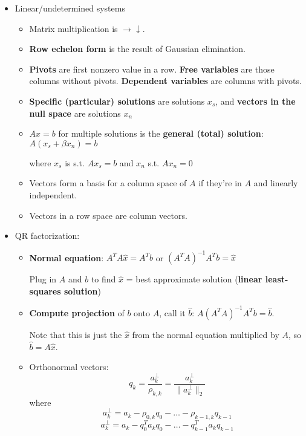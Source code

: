\documentclass[a4paper]{article}
\begin{document}
	\begin{itemize}
    	\item Linear/undetermined systems
        \begin{itemize}
        	\item Matrix multiplication is \(\rightarrow \downarrow\).
			\item \textbf{Row echelon form} is the result of Gaussian elimination.
        	\item \textbf{Pivots} are first nonzero value in a row. \textbf{Free variables} are those columns without pivots. \textbf{Dependent variables} are columns with pivots.
            \item \textbf{Specific (particular) solutions} are solutions \(x_s\), and \textbf{vectors in the null space} are solutions \(x_n\)
          	\item \(Ax=b\) for multiple solutions is the \textbf{general (total) solution}: \(A(x_s+\beta x_n)=b\)

            where \(x_s\) is s.t. \(Ax_s=b\) and \(x_n\) s.t. \(Ax_n=0\)
            \item Vectors form a basis for a column space of \(A\) if they're in \(A\) and linearly independent.
            \item Vectors in a row space are column vectors.
        \end{itemize}

		\item QR factorization:
    		\begin{itemize}
    			\item \textbf{Normal equation}: \(A^TA\hat{x}=A^Tb\) or \((A^TA)^{-1}A^Tb=\hat{x}\)

                Plug in \(A\) and \(b\) to find \(\hat{x}\) = best approximate solution (\textbf{linear least-squares solution})

				\item \textbf{Compute projection} of \( b \) onto \(A\), call it \(\hat{b}\): \(A(A^TA)^{−1}A^Tb=\hat{b}\).

                Note that this is just the \(\hat{x}\) from the normal equation multiplied by \(A\), so \(\hat{b}=A\hat{x}\).

				\item Orthonormal vectors: $$q_k=\frac{a^\bot _k}{\rho _{k,k}}=\frac{a^{\bot }_k}{\parallel a^{\bot }_k \parallel _2}$$ where
					$$a^\bot _k = a_k − \rho _{0,k}q_0− \dots −\rho _{k−1,k}q_{k−1}$$
					$$a^\bot _k=a_k−q^T_0a_kq_0−\dots −q^T_{k−1}a_kq_{k−1}$$


\end{itemize}
\end{itemize}
\end{document}
